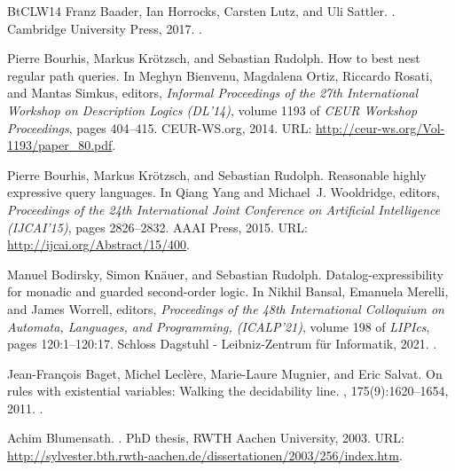 \documentclass[10pt,a4paper]{amsart}
\theoremstyle{definition}
\numberwithin{equation}{section}
\theoremstyle{plain}
\theoremstyle{definition}
\theoremstyle{myexample}
\theoremstyle{plain}
\theoremstyle{definition}
\begin{document}
\begin{thebibliography}{BtCLW14}
Franz Baader, Ian Horrocks, Carsten Lutz, and Uli Sattler.
.
\newblock Cambridge University Press, 2017.
\newblock \href {https://doi.org/10.1017/9781139025355}
  {}.

Pierre Bourhis, Markus Kr{\"{o}}tzsch, and Sebastian Rudolph.
\newblock How to best nest regular path queries.
\newblock In Meghyn Bienvenu, Magdalena Ortiz, Riccardo Rosati, and Mantas
  Simkus, editors, {\em Informal Proceedings of the 27th International Workshop
  on Description Logics (DL'14)}, volume 1193 of {\em {CEUR} Workshop
  Proceedings}, pages 404--415. CEUR-WS.org, 2014.
\newblock URL: \url{http://ceur-ws.org/Vol-1193/paper_80.pdf}.

Pierre Bourhis, Markus Kr{\"{o}}tzsch, and Sebastian Rudolph.
\newblock Reasonable highly expressive query languages.
\newblock In Qiang Yang and Michael~J. Wooldridge, editors, {\em Proceedings of
  the 24th International Joint Conference on Artificial Intelligence
  (IJCAI'15)}, pages 2826--2832. {AAAI} Press, 2015.
\newblock URL: \url{http://ijcai.org/Abstract/15/400}.

Manuel Bodirsky, Simon Kn{\"{a}}uer, and Sebastian Rudolph.
\newblock Datalog-expressibility for monadic and guarded second-order logic.
\newblock In Nikhil Bansal, Emanuela Merelli, and James Worrell, editors, {\em
  Proceedings of the 48th International Colloquium on Automata, Languages, and
  Programming, (ICALP'21)}, volume 198 of {\em LIPIcs}, pages 120:1--120:17.
  Schloss Dagstuhl - Leibniz-Zentrum f{\"{u}}r Informatik, 2021.
\newblock \href {https://doi.org/10.4230/LIPICS.ICALP.2021.120}
  {}.

Jean-François Baget, Michel Leclère, Marie-Laure Mugnier, and Eric Salvat.
\newblock On rules with existential variables: Walking the decidability line.
, 175(9):1620--1654, 2011.
\newblock \href {https://doi.org/10.1016/j.artint.2011.03.002}
  {}.

Achim Blumensath.
.
\newblock PhD thesis, {RWTH} Aachen University, 2003.
\newblock URL:
  \url{http://sylvester.bth.rwth-aachen.de/dissertationen/2003/256/index.htm}.


\end{thebibliography}
\end{document}
